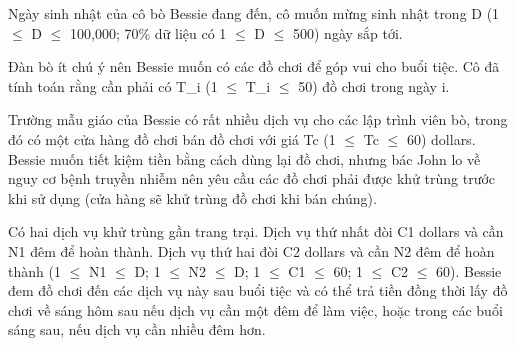 Ngày sinh nhật của cô bò Bessie đang đến, cô muốn mừng sinh nhật trong D (1  $\le$  D  $\le$  100,000; 70\% dữ liệu có 1  $\le$  D  $\le$  500) ngày sắp tới.  

   Đàn bò ít chú ý nên Bessie muốn có các đồ chơi để góp vui cho buổi tiệc. Cô đã tính toán rằng cần phải có T\_i (1  $\le$  T\_i  $\le$  50) đồ chơi trong ngày i.  

   Trường mẫu giáo của Bessie có rất nhiều dịch vụ cho các lập trình viên bò, trong đó có một cửa hàng đồ chơi bán đồ chơi với giá Tc (1  $\le$  Tc  $\le$  60) dollars. Bessie muốn tiết kiệm tiền bằng cách dùng lại đồ chơi, nhưng bác John lo về nguy cơ bệnh truyền nhiễm nên yêu cầu các đồ chơi phải được khử trùng trước khi sử dụng (cửa hàng sẽ khử trùng đồ chơi khi bán chúng).  

   Có hai dịch vụ khử trùng gần trang trại. Dịch vụ thứ nhất đòi C1 dollars và cần N1 đêm để hoàn thành. Dịch vụ thứ hai đòi C2 dollars và cần N2 đêm để hoàn thành (1  $\le$  N1  $\le$  D; 1  $\le$  N2  $\le$  D; 1  $\le$  C1  $\le$  60; 1  $\le$  C2  $\le$  60). Bessie đem đồ chơi đến các dịch vụ này sau buổi tiệc và có thể trả tiền đồng thời lấy đồ chơi về sáng hôm sau nếu dịch vụ cần một đêm để làm việc, hoặc trong các buổi sáng sau, nếu dịch vụ cần nhiều đêm hơn.  

\